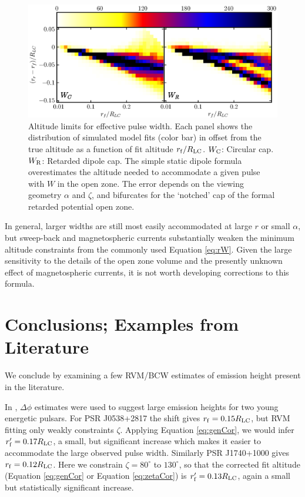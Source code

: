 \begin{figure}[t!!]
\begin{center}
\includegraphics[width=.9\textwidth]{chapters/BCWlimitations/figures/totDirFitW.eps}
\caption[Altitude limits for effective pulse width]{
Altitude limits for effective pulse width.  Each panel shows the distribution
of simulated model fits (color bar) in offset from the true altitude as a function
of fit altitude $r_{\rm{f}}/R_{\rm{LC}}$. 
$W_{\rm{C}}$: Circular cap. $W_{\rm{R}}$: Retarded dipole cap.
The simple static dipole formula overestimates the altitude needed 
to accommodate a given pulse with $W$ in the open zone. The error depends
on the viewing geometry $\alpha$ and $\zeta$, and bifurcates for the `notched'
cap of the formal retarded potential open zone.
}
\label{fig:totDirFitW}
\end{center}
\end{figure}

In general, larger widths are still most easily accommodated at large $r$ or 
small $\alpha$, but sweep-back and magnetospheric currents substantially weaken 
the minimum altitude constraints from the commonly used Equation \ref{eq:rW}. 
Given the large sensitivity to the details of the open zone volume and the presently
unknown effect of magnetospheric currents, it is not worth developing corrections to
this formula.



\section{Conclusions; Examples from Literature}

	We conclude by examining a few RVM/BCW estimates of
emission height present in the literature.

In \cite{romani2011sub}, $\Delta \phi$ estimates were used to suggest
large emission heights for two young energetic pulsars. For PSR J0538+2817 the
shift gives $r_{\rm{f}}=0.15R_{\rm{LC}}$, but RVM fitting only weakly constraints $\zeta$.
Applying Equation \ref{eq:genCor}, we would infer $r^\prime_{\rm{f}} = 0.17 R_{\rm{LC}}$,
a small, but significant increase which makes it easier to accommodate the
large observed pulse width. Similarly PSR J1740+1000 gives $r_{\rm f}=0.12R_{\rm{LC}}$.
Here we constrain $\zeta=80^{\circ}$ to $130^{\circ}$,
so that the corrected fit altitude (Equation \ref{eq:genCor} or Equation \ref{eq:zetaCor}) is 
$r^\prime_{\rm{f}}=0.13R_{\rm{LC}}$, again a small but statistically significant increase.


